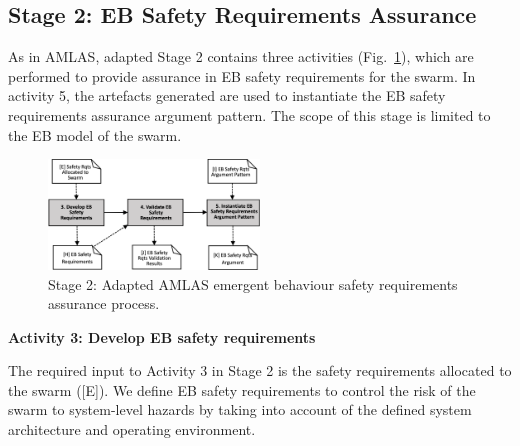 \documentclass[lettersize,journal]{IEEEtran}
\begin{document}
\subsection{Stage 2: EB Safety Requirements Assurance} \label{framework-stage2}
As in AMLAS, adapted Stage 2 contains three activities (Fig.~\ref{amlas-a-stage2}), which are performed to provide assurance in EB safety requirements for the swarm. 
In activity 5, the artefacts generated are used to instantiate the EB safety requirements assurance argument pattern. 
The scope of this stage is limited to the EB model of the swarm.\\

\begin{figure}[!t]
	\centering
	\includegraphics[width=0.5\textwidth]{figures/amlas-a-stage2-v2.png}
	\caption{Stage 2: Adapted AMLAS emergent behaviour safety requirements assurance process.}
	\label{amlas-a-stage2}
\end{figure}

\noindent \textbf{Activity 3: Develop EB safety requirements}

The required input to Activity 3 in Stage 2 is the safety requirements allocated to the swarm ([E]).
We define EB safety requirements to control the risk of the swarm to system-level hazards by taking into account of the defined system architecture and operating environment. 
\end{document}
